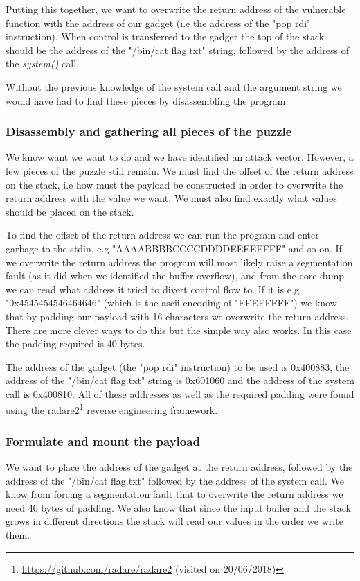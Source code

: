 Putting this together, we want to overwrite the return address of the vulnerable function
with the address of our gadget (i.e the address of the "pop rdi" instruction). When control
is transferred to the gadget the top of the stack should be the address of the "/bin/cat flag.txt"
string, followed by the address of the \textit{system()} call.

Without the previous knowledge of the system call and the argument string we would have had
to find these pieces by disassembling the program.

\subsubsection{Disassembly and gathering all pieces of the puzzle}

We know want we want to do and we have identified an attack vector. However, a few pieces
of the puzzle still remain. We must find the offset of the return address on the stack,
i.e how must the payload be constructed in order to overwrite the return address with the
value we want. We must also find exactly what values should be placed on the stack.

To find the offset of the return address we can run the program and enter garbage to the
stdin, e.g "AAAABBBBCCCCDDDDEEEEFFFF" and so on. If we overwrite the return address the
program will most likely raise a segmentation fault (as it did when we identified the
buffer overflow), and from the core dump we can read what address it tried to divert
control flow to. If it is e.g "0x4545454546464646" (which is the ascii encoding of
"EEEEFFFF") we know that by padding our payload with 16 characters we overwrite the return
address. There are more clever ways to do this but the simple way also works. In this case
the padding required is 40 bytes.

The address of the gadget (the "pop rdi" instruction) to be used is 0x400883, the address
of the "/bin/cat flag.txt" string is 0x601060 and the address of the system call is
0x400810. All of these addresses as well as the required padding were found using the
radare2\footnote{\url{https://github.com/radare/radare2} (visited on 20/06/2018)} reverse engineering framework.

\subsubsection{Formulate and mount the payload}

We want to place the address of the gadget at the return address, followed by the address
of the "/bin/cat flag.txt" followed by the address of the system call. We know from
forcing a segmentation fault that to overwrite the return address we need 40 bytes of
padding. We also know that since the input buffer and the stack grows in different
directions the stack will read our values in the order we write them.

